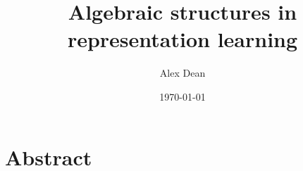 \documentclass[justified]{LaTeX/tufte-book}
\title{Algebraic structures in representation learning}
\author{Alex Dean}
\date{\today}
\begin{document}
\maketitle

\doublespacing
\frontmatter

\begin{fullwidth}
    \singlespacing
    \tableofcontents
\end{fullwidth}

\begin{fullwidth}
    \listoffigures
    \listoftables
\end{fullwidth}

\chapter{Abstract}

\mainmatter



\backmatter
\begin{fullwidth}
    \printbibliography
\end{fullwidth}
\end{document}
